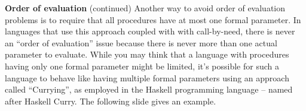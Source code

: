 \begin{minipage}[t]{\sw}
\slidenumber
\LARGE
{\bf Order of evaluation} (continued)\exx
Another way to avoid order of evaluation problems
is to require that all procedures have
at most one formal parameter.
In languages that use this approach
coupled with with call-by-need,
there is never an ``order of evaluation'' issue
because there is never more than one actual parameter to evaluate.\exx
While you may think that a language with procedures having
only one formal parameter might be limited,
it's possible for such a language
to behave like having multiple formal parameters
using an approach called ``Currying'',
as employed in the Haskell programming language
-- named after Haskell Curry.
The following slide gives an example.\exx
\end{minipage}
\clearpage
